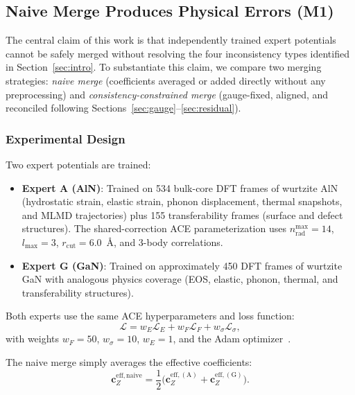 \documentclass[twoside,prb,aps,floatfix,superscriptaddress,longbibliography]{revtex4-2}
\newcommand{\cZ}{\mathbf{c}_{Z}}
\begin{document}
\subsection{Naive Merge Produces Physical Errors (M1)}
\label{sec:m1}

The central claim of this work is that independently trained expert potentials cannot be safely merged without resolving the four inconsistency types identified in Section~\ref{sec:intro}. To substantiate this claim, we compare two merging strategies: \emph{naive merge} (coefficients averaged or added directly without any preprocessing) and \emph{consistency-constrained merge} (gauge-fixed, aligned, and reconciled following Sections~\ref{sec:gauge}--\ref{sec:residual}).

\subsubsection{Experimental Design}

Two expert potentials are trained:
\begin{itemize}
    \item \textbf{Expert A (AlN)}: Trained on 534 bulk-core DFT frames of wurtzite AlN (hydrostatic strain, elastic strain, phonon displacement, thermal snapshots, and MLMD trajectories) plus 155 transferability frames (surface and defect structures). The shared-correction ACE parameterization uses $n_{\mathrm{rad}}^{\mathrm{max}} = 14$, $l_{\mathrm{max}} = 3$, $r_{\mathrm{cut}} = 6.0$~\AA, and 3-body correlations.
    \item \textbf{Expert G (GaN)}: Trained on approximately 450 DFT frames of wurtzite GaN with analogous physics coverage (EOS, elastic, phonon, thermal, and transferability structures).
\end{itemize}

Both experts use the same ACE hyperparameters and loss function:
\begin{equation}
\mathcal{L} = w_E \mathcal{L}_E + w_F \mathcal{L}_F + w_\sigma \mathcal{L}_\sigma,
\label{eq:loss}
\end{equation}
with weights $w_F = 50$, $w_\sigma = 10$, $w_E = 1$, and the Adam optimizer~\cite{Kingma2015Adam}.

The naive merge simply averages the effective coefficients:
\begin{equation}
\cZ^{\mathrm{eff,naive}} = \frac{1}{2} \big( \cZ^{\mathrm{eff,(A)}} + \cZ^{\mathrm{eff,(G)}} \big).
\label{eq:naive_merge}
\end{equation}
\end{document}
